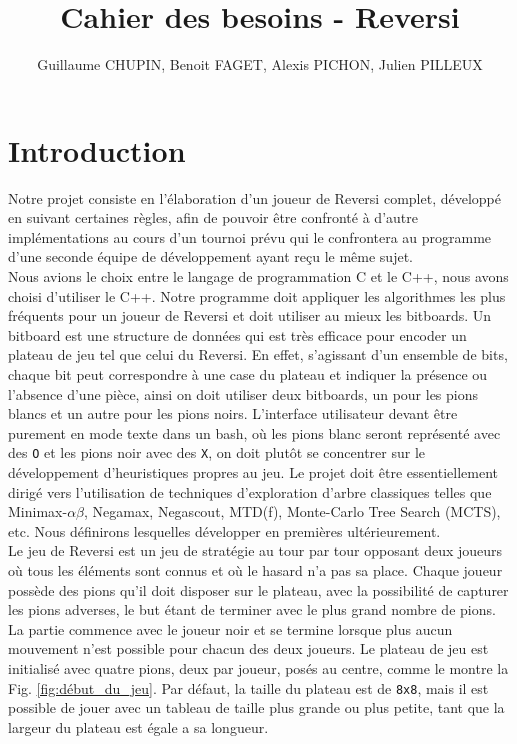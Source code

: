 \documentclass[10pt,a4paper]{article}
\title{Cahier des besoins - Reversi}
\author{Guillaume CHUPIN, Benoit FAGET, Alexis PICHON, Julien PILLEUX}
\begin{document}
\maketitle
\newpage
\tableofcontents
\newpage

\section{Introduction}
\label{sec:intro}
Notre projet consiste en l'élaboration d'un joueur de Reversi complet, développé en suivant certaines règles, afin de pouvoir être confronté à d'autre implémentations au cours d'un tournoi prévu qui le confrontera au programme d'une seconde équipe de développement ayant reçu le même sujet.\\

Nous avions le choix entre le langage de programmation C et le C++, nous avons choisi d'utiliser le C++. Notre programme doit appliquer les algorithmes les plus fréquents pour un joueur de Reversi et doit utiliser au mieux les bitboards. Un bitboard est une structure de données qui est très efficace pour encoder un plateau de jeu tel que celui du Reversi. En effet, s'agissant d'un ensemble de bits, chaque bit peut correspondre à une case du plateau et indiquer la présence ou l'absence d'une pièce, ainsi on doit utiliser deux bitboards, un pour les pions blancs et un autre pour les pions noirs. L'interface utilisateur devant être purement en mode texte dans un bash, où les pions blanc seront représenté avec des \verb!O! et les pions noir avec des \verb!X!, on doit plutôt se concentrer sur le développement d'heuristiques propres au jeu. Le projet doit être essentiellement dirigé vers l'utilisation de techniques d'exploration d'arbre classiques telles que Minimax-$\alpha\beta$, Negamax, Negascout, MTD(f), Monte-Carlo Tree Search (MCTS), etc. Nous définirons lesquelles développer en premières ultérieurement.\\

Le jeu de Reversi est un jeu de stratégie au tour par tour opposant deux joueurs où tous les éléments sont connus et où le hasard n'a pas sa place. Chaque joueur possède des pions qu'il doit disposer sur le plateau, avec la possibilité de capturer les pions adverses, le but étant de terminer avec le plus grand nombre de pions. La partie commence avec le joueur noir et se termine lorsque plus aucun mouvement n'est possible pour chacun des deux joueurs. Le plateau de jeu est initialisé avec quatre pions, deux par joueur, posés au centre, comme le montre la Fig. \ref{fig:début_du_jeu}. Par défaut, la taille du plateau est de \verb!8x8!, mais il est possible de jouer avec un tableau de taille plus grande ou plus petite, tant que la largeur du plateau est égale a sa longueur.
\end{document}
